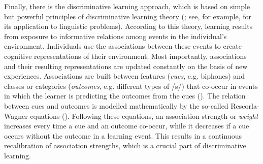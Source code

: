 Finally, there is the discriminative learning approach, which is based on simple but powerful principles of discriminative learning theory (\cite{Rescorla1988, Ramscar2007, Ramscar2010}; see, for example, \cite{Baayen2011, Baayen2019} for its application to linguistic problems). According to this theory, learning results from exposure to informative relations among events in the individual’s environment. Individuals use the associations between these events to create cognitive representations of their environment. Most importantly, associations and their resulting representations are updated constantly on the basis of new experiences. Associations are built between features (\textit{cues}, e.g. biphones) and classes or categories (\textit{outcomes}, e.g. different types of /s/) that co-occur in events in which the learner is predicting the outcomes from the cues (\cite{Tomaschek2019}). The relation between cues and outcomes is modelled mathematically by the so-called Rescorla-Wagner equations (\cite{Rescorla1972, Wagner1972, Rescorla1988}). Following these equations, an association strength or \textit{weight} increases every time a cue and an outcome co-occur, while it decreases if a cue occurs without the outcome in a learning event. This results in a continuous recalibration of association strengths, which is a crucial part of discriminative learning. 


